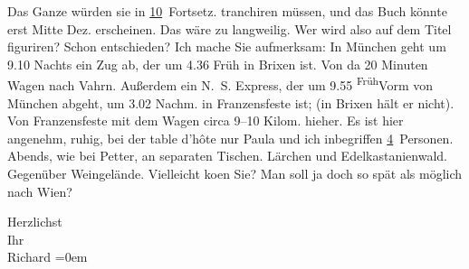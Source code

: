                Das Ganze würden sie in \uline{10} Fortsetz. tranchiren
               müssen, und das Buch könnte erst Mitte Dez. erscheinen. Das wäre zu langweilig. Wer
               wird also auf dem Titel figuriren? Schon entschieden? Ich {\pb}mache Sie aufmerksam: In München geht um 9.10 Nachts ein Zug
               ab, der um 4.36 Früh in Brixen ist. Von da 20
               Minuten Wagen nach Vahrn. Außerdem ein N. S. Express, der um
                  9.55{ }\substVorne{}\textsuperscript{Früh}\substDazwischen{}Vorm\substHinten{} von München abgeht, um 3.02
                  Nachm. in Franzensfeste ist;  (in Brixen
               hält er nicht). Von Franzensfeste mit dem Wagen
               circa 9–10 Kilom. hieher. Es ist hier angenehm, ruhig, bei der table d’hôte nur Paula und ich inbegriffen \uline{4} Personen. Abends, wie bei Petter,
               an separaten Tischen. Lärchen und Edelkastanienwald. Gegenüber Weingelände.
               Vielleicht ko{\geminationm}en Sie? Man soll ja doch so spät als
               möglich nach Wien?\pend
           
\pstart
           Herzlichst{\\[\baselineskip]}Ihr{\\[\baselineskip]}\spacefill\mbox{Richard}\pend
           \leftskip=0em{}\endnumbering{}  
      